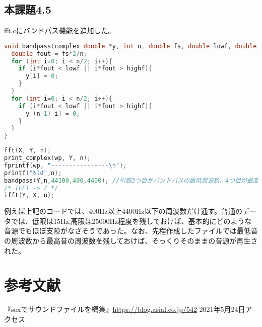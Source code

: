 \documentclass{ltjsarticle}
\begin{document}
\subsection{本課題4.5}
fft.cにバンドパス機能を追加した。
\begin{lstlisting}[caption=bandpass.c 追加関数1,language=C]
void bandpass(complex double *y, int n, double fs, double lowf, double highf){
  double fout = fs*2/n;
  for (int i=0; i < n/2; i++){
    if (i*fout < lowf || i*fout > highf){
      y[i] = 0;
    }
  }
  for (int i=0; i < n/2; i++){
    if (i*fout < lowf || i*fout > highf){
      y[(n-1)-i] = 0;
    }
  }
}
\end{lstlisting}
\begin{lstlisting}[caption=bandpass.c main関数,language=C]
fft(X, Y, n);
print_complex(wp, Y, n);
fprintf(wp, "----------------\n");
printf("%ld",n);
bandpass(Y,n,44100,400,4400); //引数3つ目がバンドパスの最低周波数、4つ目が最高周波数である。
/* IFFT -> Z */
ifft(Y, X, n);
\end{lstlisting}
例えば上記のコードでは、400Hz以上4400Hz以下の周波数だけ通す。普通のデータでは、低限は15Hz,高限は25000Hz程度を残しておけば、基本的にどのような音源でもほぼ支障がなさそうであった。なお、先程作成したファイルでは最低音の周波数から最高音の周波数を残しておけば、そっくりそのままの音源が再生された。

\section{参考文献}
『soxでサウンドファイルを編集』\url{https://blog.asial.co.jp/542} 2021年5月24日アクセス
\end{document}
